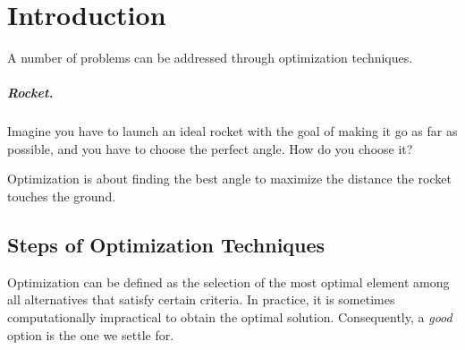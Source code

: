 \chapter{Introduction}
\label{sec:introduction}

A number of problems can be addressed through optimization techniques.

\paragraph{Rocket.} Imagine you have to launch an ideal rocket with the goal of making it go as far as possible, and you have to choose the perfect angle. How do you choose it?

Optimization is about finding the best angle to maximize the distance the rocket touches the ground.



\section{Steps of Optimization Techniques}
\label{sec:introduction.steps}

Optimization can be defined as the selection of the most optimal element among all alternatives that satisfy certain criteria. In practice, it is sometimes computationally impractical to obtain the optimal solution. Consequently, a \textit{good} option is the one we settle for.


